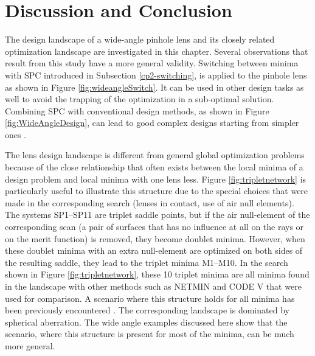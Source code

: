 \section{Discussion and Conclusion}
The design landscape of a wide-angle pinhole lens and its closely related optimization landscape are investigated in this chapter. Several observations that result from this study have a more general validity. Switching between minima with SPC introduced in Subsection \ref{cp2-switching}, is applied to the pinhole lens as shown in Figure \ref{fig:wideangleSwitch}. It can be used in other design tasks as well to avoid the trapping of the optimization in a sub-optimal solution. Combining SPC with conventional design methods, as shown in Figure \ref{fig:WideAngleDesign}, can lead to good complex designs starting from simpler ones \cite{LivshitsSP2014}.

The lens design landscape is different from general global optimization problems because of the close relationship that often exists between the local minima of a design problem and local minima with one lens less. Figure \ref{fig:tripletnetwork} is particularly useful to illustrate this structure due to the special choices that were made in the corresponding search (lenses in contact, use of air null elements). The systems SP1–SP11 are triplet saddle points, but if the air null-element of the corresponding scan (a pair of surfaces that has no influence at all on the rays or on the merit function) is removed, they become doublet minima. However, when these doublet minima with an extra null-element are optimized on both sides of the resulting saddle, they lead to the triplet minima M1–M10. In the search shown in Figure \ref{fig:tripletnetwork}, these 10 triplet minima are all minima found in the landscape with other methods such as NETMIN and CODE V that were used for comparison. A scenario where this structure holds for all minima has been previously encountered \cite{PascalTriplet2009}. The corresponding landscape is dominated by spherical aberration. The wide angle examples discussed here show that the scenario, where this structure is present for most of the minima, can be much more general.


